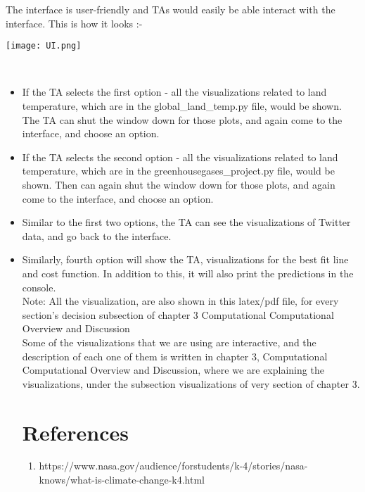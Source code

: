 \documentclass[a4paper, 11pt]{report}
\begin{document}
The interface is user-friendly and TAs would easily be able interact with the interface. This is how it looks :-

\texttt{[image: UI.png]}

~\\

\begin{itemize}
    \item If the TA selects the first option - all the visualizations related to land temperature, which are in the global\_land\_temp.py file, would be shown. The TA can shut the window down for those plots, and again come to the interface, and choose an option. \\

    \item If the TA selects the second option - all the visualizations related to land temperature, which are in the greenhousegases\_project.py file, would be shown. Then can again shut the window down for those plots, and again come to the interface, and choose an option. \\

    \item Similar to the first two options, the TA can see the visualizations of Twitter data, and go back to the interface. \\

    \item Similarly, fourth option will show the TA, visualizations for the best fit line and cost function. In addition to this, it will also print the predictions in the console. \\

    Note: All the visualization, are also shown in this latex/pdf file, for every section's decision subsection of chapter 3 Computational Computational Overview and Discussion\\

    Some of the visualizations that we are using are interactive, and the description of each one of them is written in chapter 3, Computational Computational Overview and Discussion, where we are explaining the visualizations, under the subsection visualizations of very section of chapter 3.

\newpage

\chapter{References}
\scriptsize
\begin{enumerate}
    \item https://www.nasa.gov/audience/forstudents/k-4/stories/nasa-knows/what-is-climate-change-k4.html


\end{enumerate}
\end{itemize}
\end{document}
